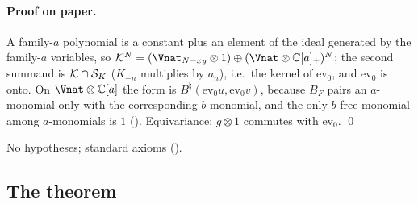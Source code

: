 \paragraph{Proof on paper.}  A family-$a$ polynomial is a constant plus an element of the ideal generated by
the family-$a$ variables, so $\chXVIIIK^N=(\Vnat_{N-xy}\otimes1)\oplus(\Vnat\otimes\mathbb C[a]_+)^N$; the second summand is
$\mathcal{K}\cap\mathcal{S}_K$ ($K_{-n}$ multiplies by $a_n$), i.e.\ the kernel of $\mathrm{ev}_0$, and $\mathrm{ev}_0$ is onto. On
$\Vnat\otimes\mathbb C[a]$ the form is $B^\natural(\mathrm{ev}_0u,\mathrm{ev}_0v)$, because $B_F$ pairs an $a$-monomial only with the
corresponding $b$-monomial, and the only $b$-free monomial among $a$-monomials is $1$
().  Equivariance: $g\otimes1$ commutes with $\mathrm{ev}_0$. \qed
\begin{status}No hypotheses; standard axioms ().\end{status}

\subsection{The theorem}

